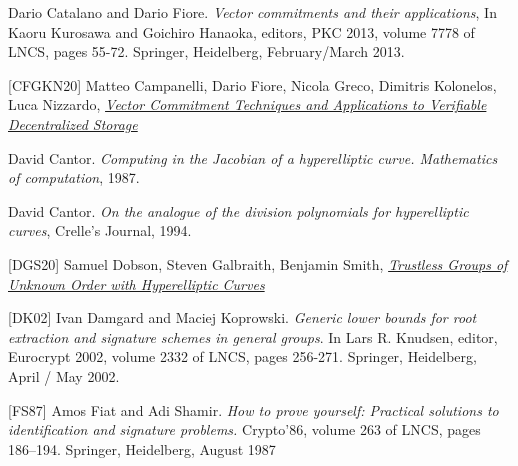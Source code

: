 \documentclass[11pt, lettersize, notitlepage, leqno, footskip=0.6cm]{article}
\newcommand{\noin}{\noindent}
\numberwithin{equation}{section}
\begin{document}
\noin [CF13] Dario Catalano and Dario Fiore. \textit{Vector commitments and their applications}, In Kaoru Kurosawa and Goichiro Hanaoka, editors, PKC 2013, volume 7778 of LNCS, pages 55-72. Springer, Heidelberg, February/March 2013. \vspace{0.1cm}

\noin \hypertarget{CFGKN20}{[CFGKN20]} Matteo Campanelli, Dario Fiore, Nicola Greco, Dimitris Kolonelos, Luca Nizzardo, \href{https://eprint.iacr.org/2020/149}{\textit{Vector Commitment Techniques and Applications to Verifiable Decentralized Storage}} \vspace{0.1cm}


\noin [Can87] David Cantor. \textit{Computing in the Jacobian of a hyperelliptic curve. Mathematics of computation}, 1987.\vspace{0.1cm}

\noin [Can94] David Cantor. \textit{On the analogue of the division polynomials for hyperelliptic curves}, Crelle's Journal, 1994.\vspace{0.1cm}

\noin \hypertarget{DGS20}{[DGS20]} Samuel Dobson, Steven Galbraith, Benjamin Smith, \href{https://eprint.iacr.org/2020/196}{\textit{Trustless Groups of Unknown Order with Hyperelliptic Curves}} \vspace{0.1cm}

\noin \hypertarget{{DK02}}{[DK02]} Ivan Damgard and Maciej Koprowski. \textit{Generic lower bounds for root extraction and signature schemes in general groups}. In Lars R. Knudsen, editor, Eurocrypt 2002, volume 2332 of LNCS, pages 256-271. Springer, Heidelberg, April / May 2002.\vspace{0.1cm}


\noin \hypertarget{FS87}{[FS87]} Amos Fiat and Adi Shamir. \textit{How to prove yourself: Practical solutions to identification and signature problems.} Crypto’86, volume 263 of LNCS, pages 186–194. Springer, Heidelberg, August 1987\vspace{0.1cm}
\end{document}
